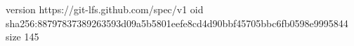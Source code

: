 version https://git-lfs.github.com/spec/v1
oid sha256:88797837389263593d09a5b5801eefe8cd4d90bbf45705bbc6fb0598e9995844
size 145

